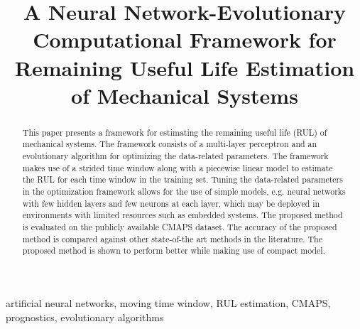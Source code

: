
\title{A Neural Network-Evolutionary Computational Framework for Remaining Useful Life Estimation of Mechanical Systems}



\maketitle

\begin{abstract}
This paper presents a framework for estimating the remaining useful life (RUL) of mechanical systems. The framework consists of a multi-layer perceptron and an evolutionary algorithm for optimizing the data-related parameters. The framework makes use of a strided time window along with a piecewise linear model to estimate the RUL for each time window in the training set. Tuning the data-related parameters in the optimization framework allows for the use of simple models, e.g. neural networks with few hidden layers and few neurons at each layer, which may be deployed in environments with limited resources such as embedded systems. The proposed method is evaluated on the publicly available CMAPS dataset. The accuracy of the proposed method is compared against other state-of-the art methods in the literature. The proposed method is shown to perform better while making use of compact model.
\end{abstract}


\begin{keywords}
artificial neural networks, moving time window, RUL estimation, CMAPS, prognostics, evolutionary algorithms
\end{keywords}

